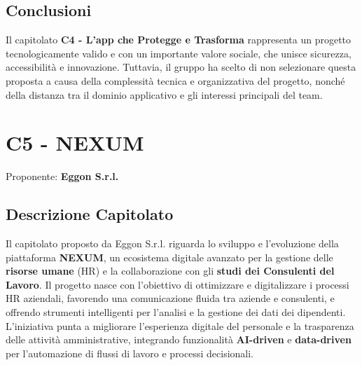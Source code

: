 \documentclass[a4paper,12pt]{article}
\begin{document}
{{    \subsection{Conclusioni}
        Il capitolato \textbf{C4 - L’app che Protegge e Trasforma} rappresenta un progetto tecnologicamente valido e con un importante valore sociale, che unisce sicurezza, accessibilità e innovazione.
        Tuttavia, il gruppo ha scelto di non selezionare questa proposta a causa della complessità tecnica e organizzativa del progetto, nonché della distanza tra il dominio applicativo e gli interessi principali del team.
    

\newpage

\section{C5 - NEXUM}
    Proponente: \textbf{Eggon S.r.l.}

    \subsection{Descrizione Capitolato}{
        Il capitolato proposto da Eggon S.r.l. riguarda lo sviluppo e l’evoluzione della piattaforma \textbf{NEXUM}, un ecosistema digitale avanzato per la gestione delle \textbf{risorse umane} (HR) e la collaborazione con gli \textbf{studi dei Consulenti del Lavoro}.
        Il progetto nasce con l’obiettivo di ottimizzare e digitalizzare i processi HR aziendali, favorendo una comunicazione fluida tra aziende e consulenti, e offrendo strumenti intelligenti per l’analisi e la gestione dei dati dei dipendenti.
        L’iniziativa punta a migliorare l’esperienza digitale del personale e la trasparenza delle attività amministrative, integrando funzionalità \textbf{AI-driven} e \textbf{data-driven} per l’automazione di flussi di lavoro e processi decisionali.
    

}}}
\end{document}
